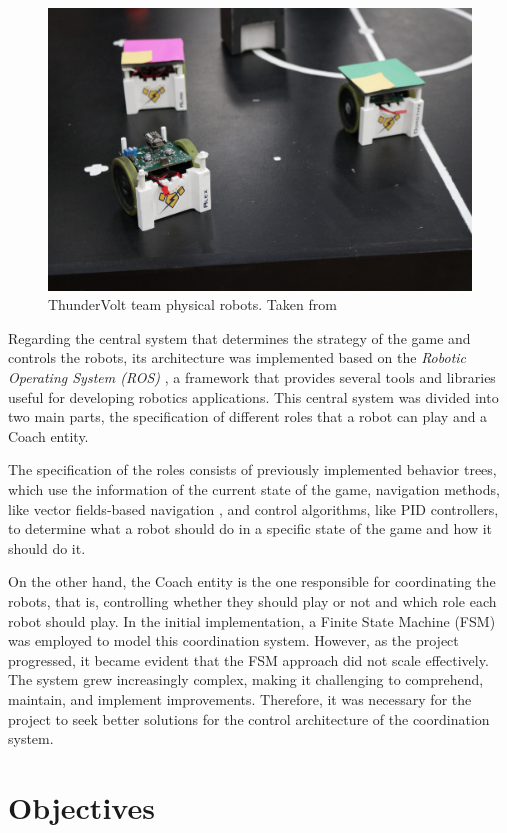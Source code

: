 \begin{figure}[!ht]
    \centering
    \includegraphics[width=.6\linewidth]{chapters/introduction/images/ThunderVolt Robots.jpeg}
    \caption{ThunderVolt team physical robots. Taken from \cite{ThunderVolt}}
    \label{fig:physical_robots}
\end{figure}

Regarding the central system that determines the strategy of the game and controls the robots, its architecture was implemented based on the \textit{Robotic Operating System (ROS)} \cite{ROS}, a framework that provides several tools and libraries useful for developing robotics applications. This central system was divided into two main parts, the specification of different roles that a robot can play and a Coach entity. 

The specification of the roles consists of previously implemented behavior trees, which use the information of the current state of the game, navigation methods, like vector fields-based navigation \cite{VectorFields}, and control algorithms, like PID controllers, to determine what a robot should do in a specific state of the game and how it should do it. 

On the other hand, the Coach entity is the one responsible for coordinating the robots, that is, controlling whether they should play or not and which role each robot should play. In the initial implementation, a Finite State Machine (FSM) was employed to model this coordination system. However, as the project progressed, it became evident that the FSM approach did not scale effectively. The system grew increasingly complex, making it challenging to comprehend, maintain, and implement improvements. Therefore, it was necessary for the project to seek better solutions for the control architecture of the coordination system.

\section{Objectives}

